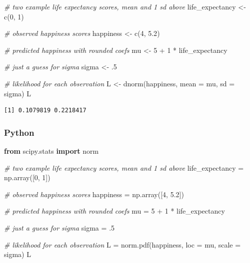 \documentclass[
  letterpaper,
]{krantz}
\newenvironment{Shaded}{}{}
\newcommand{\AttributeTok}[1]{\textcolor[rgb]{0.49,0.56,0.16}{#1}}
\newcommand{\CommentTok}[1]{\textcolor[rgb]{0.38,0.63,0.69}{\textit{#1}}}
\newcommand{\DecValTok}[1]{\textcolor[rgb]{0.25,0.63,0.44}{#1}}
\newcommand{\FloatTok}[1]{\textcolor[rgb]{0.25,0.63,0.44}{#1}}
\newcommand{\FunctionTok}[1]{\textcolor[rgb]{0.02,0.16,0.49}{#1}}
\newcommand{\ImportTok}[1]{\textcolor[rgb]{0.00,0.50,0.00}{\textbf{#1}}}
\newcommand{\NormalTok}[1]{#1}
\newcommand{\OperatorTok}[1]{\textcolor[rgb]{0.40,0.40,0.40}{#1}}
\newcommand{\OtherTok}[1]{\textcolor[rgb]{0.00,0.44,0.13}{#1}}
\newcommand{\SpecialCharTok}[1]{\textcolor[rgb]{0.25,0.44,0.63}{#1}}
\begin{document}
\begin{Shaded}
\begin{Highlighting}[]
\CommentTok{\# two example life expectancy scores, mean and 1 sd above}
\NormalTok{life\_expectancy }\OtherTok{\textless{}{-}} \FunctionTok{c}\NormalTok{(}\DecValTok{0}\NormalTok{, }\DecValTok{1}\NormalTok{)}

\CommentTok{\# observed happiness scores}
\NormalTok{happiness }\OtherTok{\textless{}{-}} \FunctionTok{c}\NormalTok{(}\DecValTok{4}\NormalTok{, }\FloatTok{5.2}\NormalTok{)}

\CommentTok{\# predicted happiness with rounded coefs}
\NormalTok{mu }\OtherTok{\textless{}{-}} \DecValTok{5} \SpecialCharTok{+} \DecValTok{1} \SpecialCharTok{*}\NormalTok{ life\_expectancy}

\CommentTok{\# just a guess for sigma}
\NormalTok{sigma }\OtherTok{\textless{}{-}}\NormalTok{ .}\DecValTok{5}

\CommentTok{\# likelihood for each observation}
\NormalTok{L }\OtherTok{\textless{}{-}} \FunctionTok{dnorm}\NormalTok{(happiness, }\AttributeTok{mean =}\NormalTok{ mu, }\AttributeTok{sd =}\NormalTok{ sigma)}
\NormalTok{L}
\end{Highlighting}
\end{Shaded}

\begin{verbatim}
[1] 0.1079819 0.2218417
\end{verbatim}

\subsubsection{Python}

\begin{Shaded}
\begin{Highlighting}[]
\ImportTok{from}\NormalTok{ scipy.stats }\ImportTok{import}\NormalTok{ norm}

\CommentTok{\# two example life expectancy scores, mean and 1 sd above}
\NormalTok{life\_expectancy }\OperatorTok{=}\NormalTok{ np.array([}\DecValTok{0}\NormalTok{, }\DecValTok{1}\NormalTok{])}

\CommentTok{\# observed happiness scores}
\NormalTok{happiness }\OperatorTok{=}\NormalTok{ np.array([}\DecValTok{4}\NormalTok{, }\FloatTok{5.2}\NormalTok{])}

\CommentTok{\# predicted happiness with rounded coefs}
\NormalTok{mu }\OperatorTok{=} \DecValTok{5} \OperatorTok{+} \DecValTok{1} \OperatorTok{*}\NormalTok{ life\_expectancy}

\CommentTok{\# just a guess for sigma}
\NormalTok{sigma }\OperatorTok{=} \FloatTok{.5}

\CommentTok{\# likelihood for each observation}
\NormalTok{L }\OperatorTok{=}\NormalTok{ norm.pdf(happiness, loc }\OperatorTok{=}\NormalTok{ mu, scale }\OperatorTok{=}\NormalTok{ sigma)}
\NormalTok{L}
\end{Highlighting}
\end{Shaded}
\end{document}
